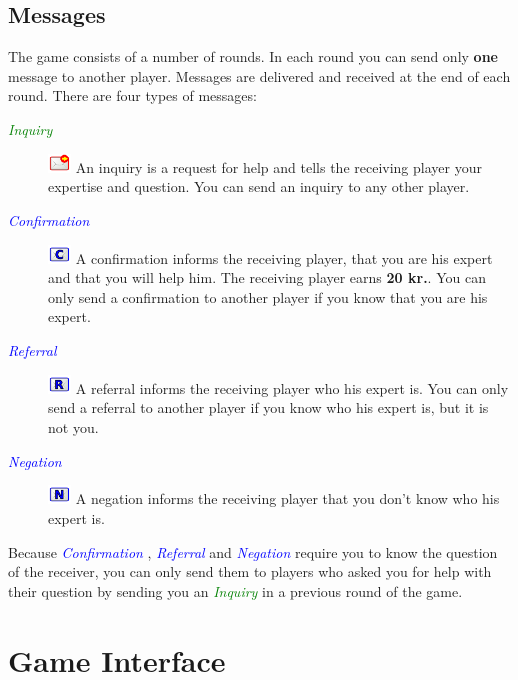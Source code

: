 \documentclass[a4paper,10pt]{article}
\newcommand{\ActionI}[0]{\action{green}{Inquiry} }
\newcommand{\ActionR}[0]{\action{blue}{Referral} }
\newcommand{\ActionC}[0]{\action{blue}{Confirmation} }
\newcommand{\ActionN}[0]{\action{blue}{Negation} }
\newcommand{\action}[2]{\textcolor{#1}{\emph{{#2}}}}
\newcommand{\Money}[1]{\textcolor[rgb]{0.7,0.7,0}{\textbf{{#1}}}}
\begin{document}
 \subsection{Messages}
 The game consists of a number of rounds. In each round you can send only \textbf{one} message to another player. Messages are delivered and received at the end of each round.
 There are four types of messages: 
 \begin{description}
  \item[\ActionI]  \includegraphics[width=0.05\textwidth]{Send.pdf} An inquiry is a request for help and tells the receiving player your expertise and question. You can send an inquiry to any other player.
  \item[\ActionC] \includegraphics[width=0.05\textwidth]{Confirm.pdf} A confirmation informs the receiving player, that you are his expert and that you will help him. The receiving player earns \Money{20 kr.}. You can only send a confirmation to another player if you know that you are his expert.
 \item[\ActionR] \includegraphics[width=0.05\textwidth]{Refer.pdf} A referral informs the receiving player who his expert is. You can only send a referral to another player if you know who his expert is, but it is not you.
 \item[\ActionN] \includegraphics[width=0.05\textwidth]{Negate.pdf} A negation informs the receiving player that you don't know who his expert is.
 \end{description}
 Because \ActionC, \ActionR and \ActionN require you to know the question of the receiver, you can only send them to players who asked you for help with their question by sending you an \ActionI in a previous round of the game.
 \section{Game Interface}
 
\end{document}
